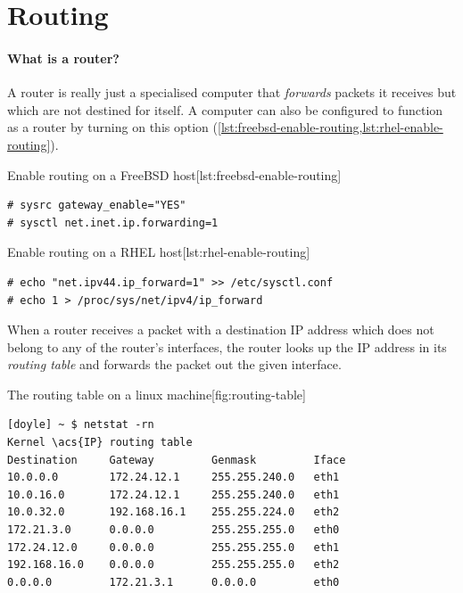 \section{Routing}
\label{sec:ip-routing}

\paragraph{What is a router?}
A router is really just a specialised computer that \emph{forwards} packets it receives but which are not destined for itself.
A computer can also be configured to function as a router by turning on this option (\vref{lst:freebsd-enable-routing,lst:rhel-enable-routing}).


\begin{fltlisting}[h!]
\begin{sidecaption}{Enable routing on a FreeBSD host}[lst:freebsd-enable-routing]
\begin{lstlisting}
# sysrc gateway_enable="YES"
# sysctl net.inet.ip.forwarding=1
\end{lstlisting}
\end{sidecaption}
\end{fltlisting}

\begin{fltlisting}[h!]
\begin{sidecaption}{Enable routing on a \acs{RHEL} host}[lst:rhel-enable-routing]
\begin{lstlisting}
# echo "net.ipv44.ip_forward=1" >> /etc/sysctl.conf
# echo 1 > /proc/sys/net/ipv4/ip_forward
\end{lstlisting}
\end{sidecaption}
\end{fltlisting}


When a router receives a packet with a destination \acs{IP} address which does not belong to any of the router's interfaces, the router looks up the \acs{IP} address in its \emph{routing table} and forwards the packet out the given interface.%

\begin{fltlisting}[h!]
\begin{sidecaption}{The routing table on a linux machine}[fig:routing-table]
\begin{lstlisting}
[doyle] ~ $ netstat -rn
Kernel \acs{IP} routing table
Destination     Gateway         Genmask         Iface
10.0.0.0        172.24.12.1     255.255.240.0   eth1
10.0.16.0       172.24.12.1     255.255.240.0   eth1
10.0.32.0       192.168.16.1    255.255.224.0   eth2
172.21.3.0      0.0.0.0         255.255.255.0   eth0
172.24.12.0     0.0.0.0         255.255.255.0   eth1
192.168.16.0    0.0.0.0         255.255.255.0   eth2
0.0.0.0         172.21.3.1      0.0.0.0         eth0
\end{lstlisting}
\end{sidecaption}
\end{fltlisting}

